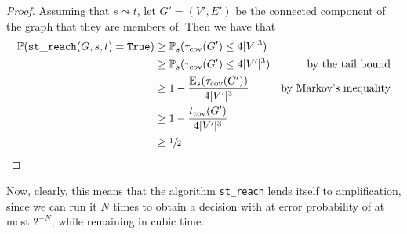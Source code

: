 	\begin{proof}
		Assuming that $s \leadsto t$, let $G' = (V', E')$ be the connected component of 
		the graph that they are members of. Then we have that
		\begin{align*}
			\mathbb{P}(\mathtt{st\_reach}(G, s, t) = \mathtt{True}) &\geq 
			\mathbb{P}_s(\tau_\mathrm{cov}(G') \leq 4 |V|^3) \\
			&\geq\mathbb{P}_s(\tau_\mathrm{cov}(G')\leq4|V'|^3)
			&\text{by the tail bound}\\
			&\geq 1 - \frac{\mathbb{E}_s(\tau_\mathrm{cov}(G'))}{4|V'|^3}&
			\text{by Markov's inequality}\\
			&\geq 1 - \frac{t_\mathrm{cov}(G')}{4|V'|^3} \\
			&\geq \sfrac{1}{2}
		\end{align*}
	\end{proof}
	Now, clearly, this means that the algorithm \texttt{st\_reach} lends itself to 
	amplification, since we can run it $N$ times to obtain a decision with at error 
	probability of at most $2^{-N}$, while remaining in cubic time.

